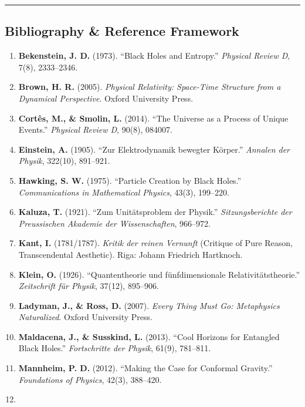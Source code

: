 \documentclass[
]{article}
\providecommand{\tightlist}{%
  \setlength{\itemsep}{0pt}\setlength{\parskip}{0pt}}
\begin{document}
\begin{center}\rule{0.5\linewidth}{0.5pt}\end{center}

\subsection{Bibliography \& Reference
Framework}\label{bibliography-reference-framework}

\begin{enumerate}
\def\labelenumi{\arabic{enumi}.}
\tightlist
\item
  \textbf{Bekenstein, J. D.} (1973). ``Black Holes and Entropy.''
  \emph{Physical Review D}, 7(8), 2333--2346.
\item
  \textbf{Brown, H. R.} (2005). \emph{Physical Relativity: Space-Time
  Structure from a Dynamical Perspective}. Oxford University Press.
\item
  \textbf{Cortês, M., \& Smolin, L.} (2014). ``The Universe as a Process
  of Unique Events.'' \emph{Physical Review D}, 90(8), 084007.
\item
  \textbf{Einstein, A.} (1905). ``Zur Elektrodynamik bewegter Körper.''
  \emph{Annalen der Physik}, 322(10), 891--921.
\item
  \textbf{Hawking, S. W.} (1975). ``Particle Creation by Black Holes.''
  \emph{Communications in Mathematical Physics}, 43(3), 199--220.
\item
  \textbf{Kaluza, T.} (1921). ``Zum Unitätsproblem der Physik.''
  \emph{Sitzungsberichte der Preussischen Akademie der Wissenschaften},
  966--972.
\item
  \textbf{Kant, I.} (1781/1787). \emph{Kritik der reinen Vernunft}
  (Critique of Pure Reason, Transcendental Aesthetic). Riga: Johann
  Friedrich Hartknoch.
\item
  \textbf{Klein, O.} (1926). ``Quantentheorie und fünfdimensionale
  Relativitätstheorie.'' \emph{Zeitschrift für Physik}, 37(12),
  895--906.
\item
  \textbf{Ladyman, J., \& Ross, D.} (2007). \emph{Every Thing Must Go:
  Metaphysics Naturalized}. Oxford University Press.
\item
  \textbf{Maldacena, J., \& Susskind, L.} (2013). ``Cool Horizons for
  Entangled Black Holes.'' \emph{Fortschritte der Physik}, 61(9),
  781--811.
\item
  \textbf{Mannheim, P. D.} (2012). ``Making the Case for Conformal
  Gravity.'' \emph{Foundations of Physics}, 42(3), 388--420.
\item

\end{enumerate}
\end{document}
